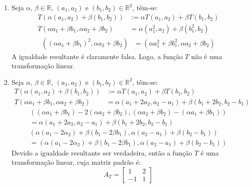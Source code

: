 \begin{resolution}
  \vspace{-24pt}
  \begin{enumerate}[label=\alph*)]
    \item Seja $\alpha$, $\beta \in \mathbb{R}$, $(a_1, a_2)$ e $(b_1, b_2) \in \mathbb{R}^2$, têm-se:
          \begin{align}
            T(\alpha(a_1,a_2) + \beta(b_1,b_2))               & := \alpha T(a_1, a_2) + \beta T(b_1, b_2)  \\
            T(\alpha a_1 + \beta b_1, \alpha a_2 + \beta b_2) & = \alpha (a_1^2, a_2) + \beta (b_1^2, b_2)
          \end{align}
          \begin{align}
            ((\alpha a_1 + \beta b_1)^2, \alpha a_2 + \beta b_2) & = (\alpha a_1^2 + \beta b_1^2, \alpha a_2 + \beta b_2)
          \end{align}
          A igualdade resultante é claramente falsa. Logo, a função $T$ não é uma transformação linear.

    \item  Seja $\alpha$, $\beta \in \mathbb{R}$, $(a_1, a_2)$ e $(b_1, b_2) \in \mathbb{R}^2$, têm-se:
          \begin{align}
            T(\alpha(a_1,a_2) + \beta(b_1,b_2))               & := \alpha T(a_1, a_2) + \beta T(b_1, b_2)                        \\
            T(\alpha a_1 + \beta b_1, \alpha a_2 + \beta b_2) & = \alpha (a_1 + 2a_2, a_2 - a_1) + \beta (b_1 + 2b_2, b_2 - b_1)
          \end{align}
          \vspace{-58pt}
          \begin{multline}
            ((\alpha a_1 + \beta b_1) - 2 (\alpha a_2 + \beta b_2), (\alpha a_2 + \beta b_2) - (\alpha a_1 + \beta b_1))  \\ = \alpha (a_1 + 2a_2, a_2 - a_1) + \beta (b_1 + 2b_2, b_2 - b_1)
          \end{multline}
          \vspace{-58pt}
          \begin{multline}
            (\alpha (a_1 - 2 \alpha_2) + \beta (b_1 - 2 \beta b_1), \alpha(a_2 - a_1) + \beta(b_2 - b_1)) \\ = (\alpha (a_1 - 2 \alpha_2) + \beta (b_1 - 2 \beta b_1), \alpha(a_2 - a_1) + \beta(b_2 - b_1))
          \end{multline}
          Devido a igualdade resultante ser verdadeira, então a função $T$ é uma transformação linear, cuja matriz padrão é:
          \begin{equation}
            A_T = \begin{bmatrix}
              1  & 2 \\
              -1 & 1
            \end{bmatrix}
          \end{equation}


\end{enumerate}
\end{resolution}
